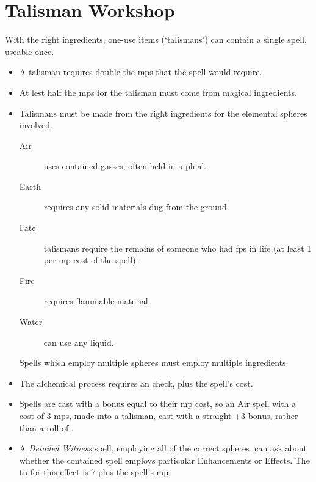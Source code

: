 \chapter{Talisman Workshop}

With the right ingredients, one-use items (`talismans') can contain a single spell, useable once.

\begin{itemize}
  \item
  A talisman requires double the \glspl{mp} that the spell would require.
  \item
  At lest half the \glspl{mp} for the talisman must come from magical ingredients.
  \item
  Talismans must be made from the right ingredients for the elemental spheres involved.
  \begin{description}
    \item[Air]
    uses contained gasses, often held in a phial.
    \item[Earth]
    requires any solid materials dug from the ground.
    \item[Fate]
    talismans require the remains of someone who had \glspl{fp} in life (at least 1 per \gls{mp} cost of the spell).
    \item[Fire]
    requires flammable material.
    \item[Water]
    can use any liquid.
  \end{description}
  Spells which employ multiple spheres must employ multiple ingredients.
  \item
  The alchemical process requires an  check, \tn[7] plus the spell's cost.
  \item
  Spells are cast with a bonus equal to their \gls{mp} cost, so an Air spell with a cost of 3 \glspl{mp}, made into a talisman, cast with a straight +3 bonus, rather than a roll of .
  \item
  A \textit{Detailed Witness} spell, employing all of the correct spheres, can ask about whether the contained spell employs particular Enhancements or Effects.
  The \gls{tn} for this effect is 7 plus the spell's \gls{mp}
\end{itemize}


